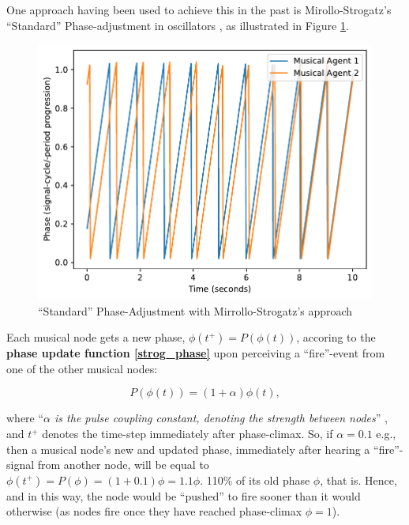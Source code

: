 	One approach having been used to achieve this in the past is Mirollo-Strogatz's ``Standard'' Phase-adjustment in oscillators \cite{mirollo_strogatz_PCO_synch}, as illustrated in Figure \ref{fig:strog_phase}.
			
	\begin{figure}[h]
		\centering
		\includegraphics[width=0.9\linewidth]{Assets/Figures/MirolloStrogatzPhaseAdjustment.pdf}
		\caption{``Standard'' Phase-Adjustment with Mirrollo-Strogatz's approach}
		\label{fig:strog_phase}
	\end{figure}
	
	Each musical node gets a new phase, $\phi(t^+) = P(\phi(t))$, accoring to the \textbf{phase update function \eqref{strog_phase}} upon perceiving a ``fire''-event from one of the other musical nodes:
	
	\begin{equation}\label{strog_phase}
	P(\phi(t)) = (1 + \alpha)\phi(t)	,
	\end{equation}
	
	where ``\textit{$\alpha$ is the pulse coupling constant, denoting the strength between nodes}'' \cite{nymoen_synch}, and $t^+$ denotes the time-step immediately after phase-climax. So, if $\alpha = 0.1$ e.g., then a musical node's new and updated phase, immediately after hearing a ``fire''-signal from another node, will be equal to $\phi(t^+) = P(\phi) = (1 + 0.1)\phi = 1.1\phi$. 110\% of its old phase $\phi$, that is. Hence, and in this way, the node would be ``pushed'' to fire sooner than it would otherwise (as nodes fire once they have reached phase-climax $\phi=1$).
		
	
	
	
